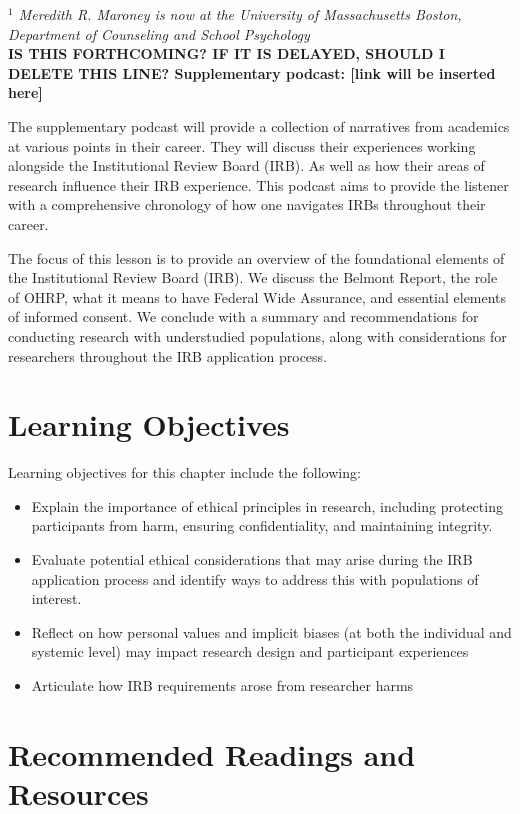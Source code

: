 \documentclass[
  11pt,
]{book}
\providecommand{\tightlist}{%
  \setlength{\itemsep}{0pt}\setlength{\parskip}{0pt}}
\begin{document}
\emph{\(^{1}\) Meredith R. Maroney is now at the University of Massachusetts Boston, Department of Counseling and School Psychology}\\

\textbf{IS THIS FORTHCOMING? IF IT IS DELAYED, SHOULD I DELETE THIS LINE? Supplementary podcast: {[}link will be inserted here{]}}

The supplementary podcast will provide a collection of narratives from academics at various points in their career. They will discuss their experiences working alongside the Institutional Review Board (IRB). As well as how their areas of research influence their IRB experience. This podcast aims to provide the listener with a comprehensive chronology of how one navigates IRBs throughout their career.

The focus of this lesson is to provide an overview of the foundational elements of the Institutional Review Board (IRB). We discuss the Belmont Report, the role of OHRP, what it means to have Federal Wide Assurance, and essential elements of informed consent. We conclude with a summary and recommendations for conducting research with understudied populations, along with considerations for researchers throughout the IRB application process.

\section{Learning Objectives}\label{learning-objectives-8}

Learning objectives for this chapter include the following:

\begin{itemize}
\tightlist
\item
  Explain the importance of ethical principles in research, including protecting participants from harm, ensuring confidentiality, and maintaining integrity.
\item
  Evaluate potential ethical considerations that may arise during the IRB application process and identify ways to address this with populations of interest.
\item
  Reflect on how personal values and implicit biases (at both the individual and systemic level) may impact research design and participant experiences\\
\item
  Articulate how IRB requirements arose from researcher harms
\end{itemize}

\section{Recommended Readings and Resources}\label{recommended-readings-and-resources-5}
\end{document}
